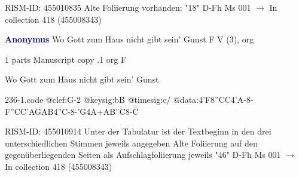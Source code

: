 \documentclass[twocolumn]{book}
\begin{document}
\newline RISM-ID: 455010835
\newline Alte Foliierung vorhanden: "18"
\newline D-Fh  Ms 001
\newline $\rightarrow$ In collection 418 (455008343)

\newline \par \vspace{7pt} \textcolor{darkblue}{\textbf{Anonymus  }}
\newline Wo Gott zum Haus nicht gibt sein' Gunst  F  
\newline V (3), org
\newline \begin{itshape}\end{itshape} 
\newline \textcolor{darkblue}{}  1 parts  
\newline Manuscript copy
.1  org  F
\newline \begin{footnotesize} Wo Gott zum Haus nicht gibt sein' Gunst \end{footnotesize}  
\begin{filecontents*}{236-1.code}
@clef:G-2
@keysig:bB
@timesig:c/
@data:4'F{8''CC}4'A-8-F{''CC}{'AGAB}4''C-8-'G4A+AB''C8-C
\end{filecontents*}
\newline
%

\newline RISM-ID: 455010914
\newline Unter der Tabulatur ist der Textbeginn in den drei unterschiedlichen Stimmen jeweils angegeben
\newline Alte Foliierung auf den gegenüberliegenden Seiten als Aufschlagfoliierung jeweils "46"
\newline D-Fh  Ms 001
\newline $\rightarrow$ In collection 418 (455008343)
\end{document}
